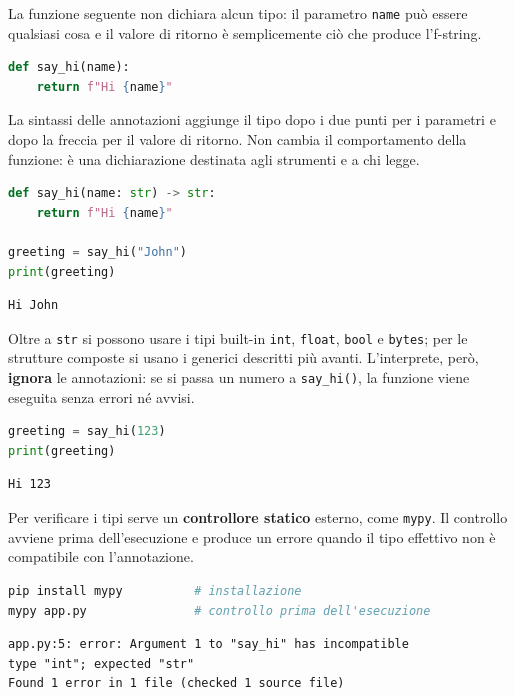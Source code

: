 \documentclass[12pt]{extarticle}
\begin{document}
\noindent La funzione seguente non dichiara alcun tipo: il parametro \texttt{name} può essere qualsiasi cosa e il valore di ritorno è semplicemente ciò che produce l'f-string.

\begin{lstlisting}[language=Python]
def say_hi(name):
    return f"Hi {name}"
\end{lstlisting}

\noindent La sintassi delle annotazioni aggiunge il tipo dopo i due punti per i parametri e dopo la freccia per il valore di ritorno. Non cambia il comportamento della funzione: è una dichiarazione destinata agli strumenti e a chi legge.

\begin{lstlisting}[language=Python]
def say_hi(name: str) -> str:
    return f"Hi {name}"

greeting = say_hi("John")
print(greeting)
\end{lstlisting}

\begin{lstlisting}[numbers=none]
Hi John
\end{lstlisting}

\noindent Oltre a \texttt{str} si possono usare i tipi built-in \texttt{int}, \texttt{float}, \texttt{bool} e \texttt{bytes}; per le strutture composte si usano i generici descritti più avanti. L'interprete, però, \textbf{ignora} le annotazioni: se si passa un numero a \texttt{say\_hi()}, la funzione viene eseguita senza errori né avvisi.

\begin{lstlisting}[language=Python]
greeting = say_hi(123)
print(greeting)
\end{lstlisting}

\begin{lstlisting}[numbers=none]
Hi 123
\end{lstlisting}

\noindent Per verificare i tipi serve un \textbf{controllore statico} esterno, come \texttt{mypy}. Il controllo avviene prima dell'esecuzione e produce un errore quando il tipo effettivo non è compatibile con l'annotazione.

\begin{lstlisting}[language=Python]
pip install mypy          # installazione
mypy app.py               # controllo prima dell'esecuzione
\end{lstlisting}

\begin{lstlisting}[numbers=none]
app.py:5: error: Argument 1 to "say_hi" has incompatible
type "int"; expected "str"
Found 1 error in 1 file (checked 1 source file)
\end{lstlisting}
\end{document}
